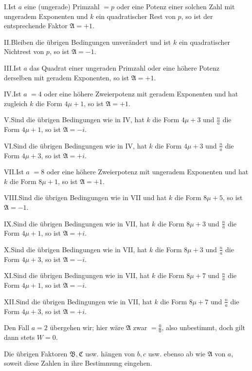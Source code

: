 I.\quad Ist $a$ eine (ungerade) Primzahl $=p$ oder eine Potenz einer solchen Zahl mit ungeradem Exponenten und $k$ ein quadratischer Rest von $p$, so ist der entsprechende Faktor $\mathfrak A=+1$.

II.\quad Bleiben die übrigen Bedingungen unverändert und ist $k$ ein quadratischer Nichtrest von $p$, so ist $\mathfrak A=-1$.

III.\quad Ist $a$ das Quadrat einer ungeraden Primzahl oder eine höhere Potenz derselben mit geradem Exponenten, so ist $\mathfrak A=+1$.

IV.\quad Ist $a$ $=4$ oder eine höhere Zweierpotenz mit geradem Exponenten und hat zugleich $k$ die Form $4\mu+1$, so ist $\mathfrak A=+1$.

V.\quad Sind die übrigen Bedingungen wie in IV, hat $k$ die Form $4\mu+3$ und $\frac{n}{a}$ die Form $4\mu+1$, so ist $\mathfrak A=-i$.

VI.\quad Sind die übrigen Bedingungen wie in IV, hat $k$ die Form $4\mu+3$ und $\frac{n}{a}$ die Form $4\mu+3$, so ist $\mathfrak A=+i$.

VII.\quad Ist $a$ $=8$ oder eine höhere Zweierpotenz mit ungeradem Exponenten und hat $k$ die Form $8\mu+1$, so ist $\mathfrak A=+1$.

VIII.\quad Sind die übrigen Bedingungen wie in VII und hat $k$ die Form $8\mu+5$, so ist $\mathfrak A=-1$.

IX.\quad Sind die übrigen Bedingungen wie in VII, hat $k$ die Form $8\mu+3$ und $\frac{n}{a}$ die Form $4\mu+1$, so ist $\mathfrak A=+i$.


X.\quad Sind die übrigen Bedingungen wie in VII, hat $k$ die Form $8\mu+3$ und $\frac{n}{a}$ die Form $4\mu+3$, so ist $\mathfrak A=-i$.

XI.\quad Sind die übrigen Bedingungen wie in VII, hat $k$ die Form $8\mu+7$ und $\frac{n}{a}$ die Form $4\mu+1$, so ist $\mathfrak A=-i$.

XII.\quad Sind die übrigen Bedingungen wie in VII, hat $k$ die Form $8\mu+7$ und $\frac{n}{a}$ die Form $4\mu+3$, so ist $\mathfrak A=+i$.

Den Fall $a=2$ übergehen wir; hier wäre $\mathfrak A$ zwar $=\frac00$, also unbestimmt, doch gilt dann stets $W=0$.

Die übrigen Faktoren $\mathfrak B,\mathfrak C$ usw. hängen von $b,c$ usw. ebenso ab wie $\mathfrak A$ von $a$, soweit diese Zahlen in ihre Bestimmung eingehen.


